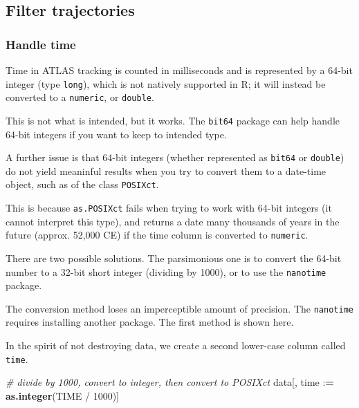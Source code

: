 \documentclass[
]{scrartcl}
\newenvironment{Shaded}{}{}
\newcommand{\CommentTok}[1]{\textcolor[rgb]{0.38,0.63,0.69}{\textit{#1}}}
\newcommand{\DecValTok}[1]{\textcolor[rgb]{0.25,0.63,0.44}{#1}}
\newcommand{\ErrorTok}[1]{\textcolor[rgb]{1.00,0.00,0.00}{\textbf{#1}}}
\newcommand{\KeywordTok}[1]{\textcolor[rgb]{0.00,0.44,0.13}{\textbf{#1}}}
\newcommand{\NormalTok}[1]{#1}
\newcommand{\OperatorTok}[1]{\textcolor[rgb]{0.40,0.40,0.40}{#1}}
\newcommand{\StringTok}[1]{\textcolor[rgb]{0.25,0.44,0.63}{#1}}
\begin{document}
\hypertarget{filter-trajectories}{%
\subsection{Filter trajectories}\label{filter-trajectories}}

\hypertarget{handle-time}{%
\subsubsection{Handle time}\label{handle-time}}

Time in ATLAS tracking is counted in milliseconds and is represented by a 64-bit integer (type \texttt{long}), which is not natively supported in R; it will instead be converted to a \texttt{numeric}, or \texttt{double}.

This is not what is intended, but it works. The \texttt{bit64} package can help handle 64-bit integers if you want to keep to intended type.

A further issue is that 64-bit integers (whether represented as \texttt{bit64} or \texttt{double}) do not yield meaninful results when you try to convert them to a date-time object, such as of the class \texttt{POSIXct}.

This is because \texttt{as.POSIXct} fails when trying to work with 64-bit integers (it cannot interpret this type), and returns a date many thousands of years in the future (approx. 52,000 CE) if the time column is converted to \texttt{numeric}.

There are two possible solutions. The parsimonious one is to convert the 64-bit number to a 32-bit short integer (dividing by 1000), or to use the \texttt{nanotime} package.

The conversion method loses an imperceptible amount of precision. The \texttt{nanotime} requires installing another package. The first method is shown here.

In the spirit of not destroying data, we create a second lower-case column called \texttt{time}.

\begin{Shaded}
\begin{Highlighting}[]
\CommentTok{\# divide by 1000, convert to integer, then convert to POSIXct}
\NormalTok{data[, time }\OperatorTok{:}\ErrorTok{=}\StringTok{ }\KeywordTok{as.integer}\NormalTok{(TIME }\OperatorTok{/}\StringTok{ }\DecValTok{1000}\NormalTok{)]}
\end{Highlighting}
\end{Shaded}
\end{document}
